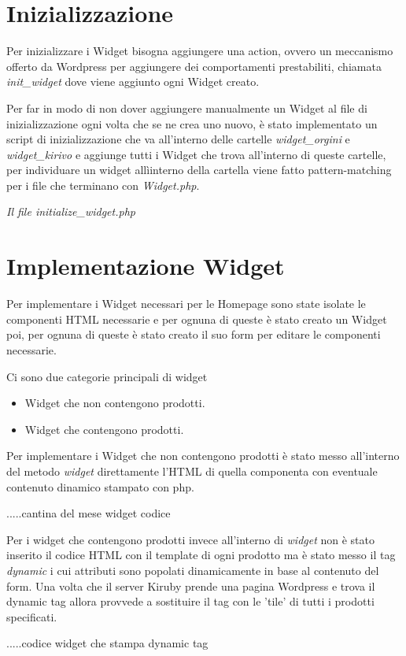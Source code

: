\newpage

\section{Inizializzazione}
Per inizializzare i Widget bisogna aggiungere una action\cite{WPACTION}, ovvero un meccanismo offerto da Wordpress per aggiungere dei comportamenti
prestabiliti,  chiamata \emph{init\_widget} dove viene aggiunto ogni Widget creato.

Per far in modo di non dover aggiungere manualmente un Widget al file di inizializzazione ogni volta che se ne crea uno nuovo, è
stato implementato un script di inizializzazione che va all'interno delle cartelle \emph{widget\_orgini} e \emph{widget\_kirivo} e aggiunge tutti
i Widget che trova all'interno di queste cartelle, per individuare un widget allìinterno della cartella viene fatto pattern-matching per i file che terminano con \emph{Widget.php}.


\emph{Il file initialize\_widget.php}

\newpage

\section{Implementazione Widget}
Per implementare i Widget necessari per le Homepage sono state isolate le componenti HTML necessarie e per ognuna
di queste è stato creato un Widget poi, per ognuna di queste è stato creato il suo form per editare le componenti necessarie.

Ci sono due categorie principali di widget
\begin{itemize}
\item Widget che non contengono prodotti.
\item Widget che contengono prodotti.
\end{itemize}

Per implementare i Widget che non contengono prodotti è stato messo all'interno del metodo \emph{widget} direttamente
l'HTML di quella componenta con eventuale contenuto dinamico stampato con php.

.....cantina del mese widget codice

Per i widget che contengono prodotti invece all'interno di \emph{widget} non è stato inserito il codice HTML con il template
di ogni prodotto ma è stato messo il tag \emph{dynamic} i cui attributi sono popolati dinamicamente in base al contenuto del form.
Una volta che il server Kiruby prende una pagina Wordpress e trova il dynamic tag allora provvede a sostituire il tag con le 'tile'
di tutti i prodotti specificati.


.....codice widget che stampa dynamic tag